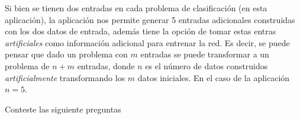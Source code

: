 \documentclass[10pt]{article}
\begin{document}
Si bien se tienen dos entradas en cada problema de clasificación (en esta aplicación), la aplicación nos permite generar 5 entradas adicionales construidas con
los dos datos de entrada, además tiene la opción de tomar estas entras \emph{artificiales} como información adicional para entrenar la red. 
Es decir, se puede pensar que dado un problema con $m$ entradas se puede transformar a un problema de $n+m$ entradas, donde $n$ 
es el número de datos construidos \emph{artificialmente} transformando los $m$ datos iniciales. En el caso de la aplicación $n=5$.%

Conteste las siguiente preguntas%
\end{document}
